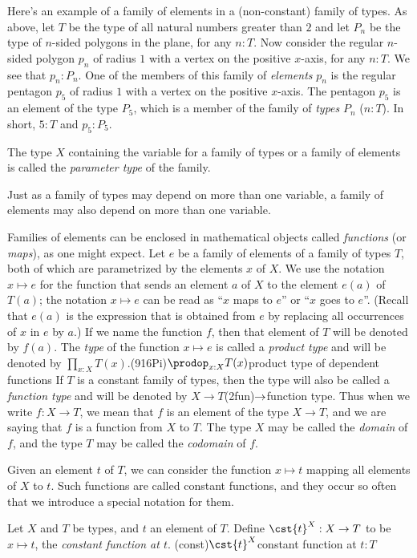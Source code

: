 Here's an example of a family of elements in a (non-constant) family of types.
As above, let $T$ be the type of all natural numbers greater than $2$ and let
$P_n$ be the type of $n$-sided polygons in the plane, for any $n:T$.
Now consider the regular $n$-sided polygon $p_n$ of radius $1$ with
a vertex on the positive $x$-axis, for any $n:T$.  We see that $p_n : P_n$.
One of the members of this family of \emph{elements} $p_n$ is the regular
pentagon $p_5$ of radius $1$ with a vertex on the positive $x$-axis.
The pentagon $p_5$ is an element of the type $P_5$, which is a member of the
family of \emph{types} $P_n$ ($n:T$). In short, $5:T$ and $p_5 : P_5$.

The type $X$ containing the variable for a family of types or a family of elements is called the \emph{parameter type} of
the family.

Just as a family of types may depend on more than one variable, a family of elements may also depend on more than one variable.

Families of elements can be enclosed in mathematical objects called \emph{functions} (or \emph{maps}), as one might
expect.
Let $e$ be a family of elements of a family of types $T$,
both of which are parametrized by the elements $x$ of $X$.  We use the notation $x \mapsto e$ for the function that sends an element $a$ of $X$
to the element $e(a)$ of $T(a)$; the notation $x \mapsto e$ can be read as ``$x$ maps to $e$'' or ``$x$ goes to $e$''.  (Recall that $e(a)$ is
the expression that is obtained from $e$ by replacing all occurrences of $x$ in $e$ by $a$.)  If we name the function $f$, then that element of
$T$ will be denoted by $f(a)$.  The \emph{type} of the function $x \mapsto e$ is called a \emph{product type} and will be denoted by
$\prod_{x:X} T(x)$.\glossary(916Pi){$\prodop_{x:X}T(x)$}{product type of dependent functions}
If $T$ is a constant family of types, then the type will also be
called a \emph{function type} and will be denoted by $X \to T$\glossary(2fun){$\protect\to$}{function type}.  Thus when we write $f : X \to T$,
we mean that $f$ is an element of the type $X \to T$, and we are saying that $f$ is a function from $X$ to $T$.  The type $X$ may be called the
\emph{domain} of $f$, and the type $T$ may be called the \emph{codomain} of $f$.

Given an element $t$ of $T$, we can consider the function $x\mapsto t$
mapping all elements of $X$ to $t$. Such functions are called
constant functions, and they occur so often that we introduce a special
notation for them.
\begin{definition}\label{def:cst-map}
Let $X$ and $T$ be types, and $t$ an element of $T$. Define
$\cst{t}^X : X\to T$ to be $x\mapsto t$, the \emph{constant function at $t$}.
\glossary(const){$\protect\cst{t}^X$}{constant function at $t:T$}
\end{definition}

